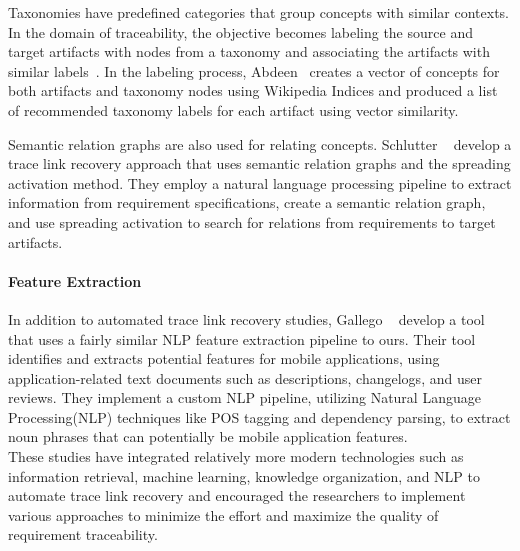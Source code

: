 Taxonomies have predefined categories that group concepts with similar contexts. In the domain of traceability, the objective becomes labeling the source and target artifacts with nodes from a taxonomy and associating the artifacts with similar labels~\cite{Taxonomy}. In the labeling process, Abdeen~\cite{abdeen-2023} creates a vector of concepts for both artifacts and taxonomy nodes using Wikipedia Indices and produced a list of recommended taxonomy labels for each artifact using vector similarity.

Semantic relation graphs are also used for relating concepts. Schlutter \etal{}~\cite{Spreading-Activation} develop a trace link recovery approach that uses semantic relation graphs and the spreading activation method. They employ a natural language processing pipeline to extract information from requirement specifications, create a semantic relation graph, and use spreading activation to search for relations from requirements to target artifacts.

\paragraph{Feature Extraction}
In addition to automated trace link recovery studies, Gallego \etal{} ~\cite{Marf2023TransFeatExAN} develop a tool that uses a fairly similar NLP feature extraction pipeline to ours. Their tool identifies and extracts potential features for mobile applications, using application-related text documents such as descriptions, changelogs, and user reviews. They implement a custom NLP pipeline, utilizing Natural Language Processing(NLP) techniques like POS tagging and dependency parsing, to extract noun phrases that can potentially be mobile application features.\\

These studies have integrated relatively more modern technologies such as information retrieval, machine learning, knowledge organization, and NLP to automate trace link recovery and encouraged the researchers to implement various approaches to minimize the effort and maximize the quality of requirement traceability.

